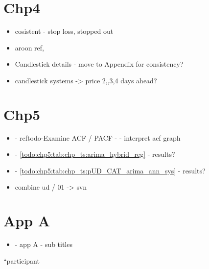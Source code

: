 \section{Chp4}
\begin{itemize}
\item cosistent - stop loss, stopped out
\item aroon ref, 
\item Candlestick details - move to Appendix for consistency?
\item candlestick systems -> price 2,,3,4 days ahead?
\end{itemize}

\section{Chp5}
\begin{itemize}
\item - ref{todo-Examine ACF / PACF} - - interpret acf graph
\item - \ref{todo:chp5:tab:chp_ts:arima_hybrid_reg} - results?
\item - \ref{todo:chp5:tab:chp_ts:pUD_CAT_arima_ann_sys} - results?
\item combine ud / 01 -> svn
\end{itemize}

\section{App A}
\begin{itemize}
\item - app A - sub titles
\end{itemize}


\textquotedblleft participant
